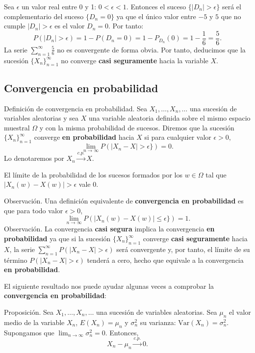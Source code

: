 \documentclass[]{book}
\begin{document}
Sea \(\epsilon\) un valor real entre 0 y 1: \(0<\epsilon <1\). Entonces el suceso \(\{|D_n|>\epsilon\}\) será el complementario del suceso \(\{D_n=0\}\) ya que el único valor entre \(-5\) y \(5\) que no cumple \(|D_n|>\epsilon\) es el valor \(D_n=0\). Por tanto:
\[
P(|D_n|>\epsilon)=1-P(D_n=0)=1-P_{D_n}(0)=1-\frac{1}{6}=\frac{5}{6}.
\]
La serie \(\sum\limits_{n=1}^\infty \frac{5}{6}\) no es convergente de forma obvia. Por tanto, deducimos que la sucesión \(\{X_n\}_{n=1}^\infty\) no converge \textbf{casi seguramente} hacia la variable \(X\).

\hypertarget{convergencia-en-probabilidad}{%
\subsection{Convergencia en probabilidad}\label{convergencia-en-probabilidad}}

Definición de convergencia en probabilidad.
Sea \(X_1,\ldots,X_n,\ldots\) una sucesión de variables aleatorias y sea \(X\) una variable aleatoria definida sobre el mismo espacio muestral \(\Omega\) y con la misma probabilidad de sucesos. Diremos que la sucesión \(\{X_n\}_{n=1}^\infty\) converge \textbf{en probabilidad} hacia \(X\) si para cualquier valor \(\epsilon >0\),
\[
\lim_{n\to\infty} P(|X_n-X|>\epsilon \})=0.
\]
Lo denotaremos por \(X_n\stackrel{c.p.}{\longrightarrow}X\).

El límite de la probabilidad de los sucesos formados por los \(w\in\Omega\) tal que \(|X_n(w)-X(w)|>\epsilon\) vale 0.

Observación.
Una definición equivalente de \textbf{convergencia en probabilidad} es que para todo valor \(\epsilon >0\),
\[
\lim_{n\to\infty} P(|X_n(w)-X(w)|\leq \epsilon \})=1.
\]
Observación.
La convergencia \textbf{casi segura} implica la convergencia \textbf{en probabilidad} ya que si la sucesión \(\{X_n\}_{n=1}^\infty\) converge \textbf{casi seguramente} hacia \(X\), la serie \(\sum_{n=1}^\infty P(|X_n-X|>\epsilon)\) será convergente y, por tanto, el límite de su término \(P(|X_n-X|>\epsilon)\) tenderá a cero, hecho que equivale a la convergencia \textbf{en probabilidad}.

El siguiente resultado nos puede ayudar algunas veces a comprobar la \textbf{convergencia en probabilidad}:

Proposición.
Sea \(X_1,\ldots,X_n,\ldots\) una sucesión de variables aleatorias. Sea \(\mu_n\) el valor medio de la variable \(X_n\), \(E(X_n)=\mu_n\) y \(\sigma_n^2\) su varianza: \(\mathrm{Var}(X_n)=\sigma_n^2\). Supongamos que \(\lim_{n\to\infty}\sigma_n^2=0\). Entonces,
\[
X_n-\mu_n\stackrel{c.p.}{\longrightarrow} 0.
\]
\end{document}
